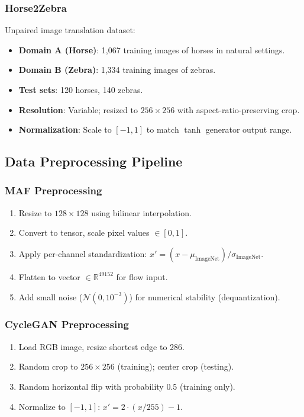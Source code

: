 \documentclass[conference]{IEEEtran}
\begin{document}
\subsubsection{Horse2Zebra}
Unpaired image translation dataset:
\begin{itemize}
\item \textbf{Domain A (Horse)}: 1,067 training images of horses in natural settings.
\item \textbf{Domain B (Zebra)}: 1,334 training images of zebras.
\item \textbf{Test sets}: 120 horses, 140 zebras.
\item \textbf{Resolution}: Variable; resized to $256 \times 256$ with aspect-ratio-preserving crop.
\item \textbf{Normalization}: Scale to $[-1, 1]$ to match $\tanh$ generator output range.
\end{itemize}

\subsection{Data Preprocessing Pipeline}
\subsubsection{MAF Preprocessing}
\begin{enumerate}
\item Resize to $128 \times 128$ using bilinear interpolation.
\item Convert to tensor, scale pixel values $\in [0, 1]$.
\item Apply per-channel standardization: $x' = (x - \mu_{\text{ImageNet}}) / \sigma_{\text{ImageNet}}$.
\item Flatten to vector $\in \mathbb{R}^{49152}$ for flow input.
\item Add small noise ($\mathcal{N}(0, 10^{-3})$) for numerical stability (dequantization).
\end{enumerate}

\subsubsection{CycleGAN Preprocessing}
\begin{enumerate}
\item Load RGB image, resize shortest edge to 286.
\item Random crop to $256 \times 256$ (training); center crop (testing).
\item Random horizontal flip with probability 0.5 (training only).
\item Normalize to $[-1, 1]$: $x' = 2 \cdot (x / 255) - 1$.
\end{enumerate}
\end{document}
